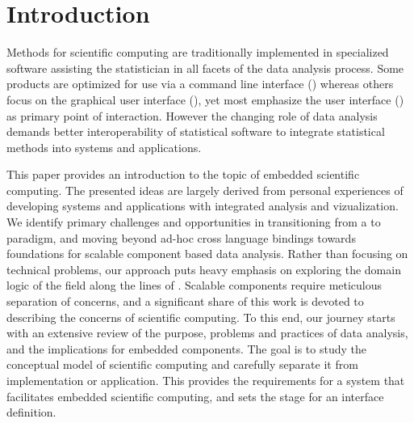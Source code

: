 \section{Introduction}

Methods for scientific computing are traditionally implemented in specialized software assisting the statistician in all facets of the data analysis process. Some products are optimized for use via a command line interface (\CLI) whereas others focus on the graphical user interface (\GUI), yet most emphasize the user interface (\UI) as primary point of interaction. However the changing role of data analysis demands better interoperability of statistical software to integrate statistical methods into systems and applications. 



This paper provides an introduction to the topic of embedded scientific computing. The presented ideas are largely derived from personal experiences of developing systems and applications with integrated analysis and vizualization. We identify primary challenges and opportunities in transitioning from a \UI to \API paradigm, and moving beyond ad-hoc cross language bindings towards foundations for scalable component based data analysis. Rather than focusing on technical problems, our approach puts heavy emphasis on exploring the domain logic of the field along the lines of \citep{evans2004domain}. Scalable components require meticulous separation of concerns, and a significant share of this work is devoted to describing the concerns of scientific computing. To this end, our journey starts with an extensive review of the purpose, problems and practices of data analysis, and the implications for embedded components. The goal is to study the conceptual model of scientific computing and carefully separate it from implementation or application. This provides the requirements for a system that facilitates embedded scientific computing, and sets the stage for an interface definition.

